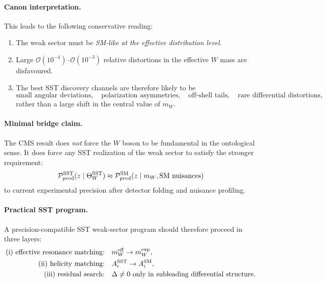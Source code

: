 \documentclass[11pt]{article}
\theoremstyle{definition}
\theoremstyle{plain}
\theoremstyle{remark}
\begin{document}
        \paragraph{Canon interpretation.}
            This leads to the following conservative reading:
            \begin{enumerate}
                \item The weak sector must be \emph{SM-like at the effective distribution level}.
                \item Large $\mathcal{O}(10^{-4})$--$\mathcal{O}(10^{-3})$ relative distortions in the effective $W$ mass are disfavoured.
                \item The best SST discovery channels are therefore likely to be
                \begin{equation}
                    \text{small angular deviations},\quad
                    \text{polarization asymmetries},\quad
                    \text{off-shell tails},\quad
                    \text{rare differential distortions},
                \end{equation}
                rather than a large shift in the central value of $m_W$.
            \end{enumerate}
    
        \paragraph{Minimal bridge claim.}
            The CMS result does \emph{not} force the $W$ boson to be fundamental in the ontological sense. It does force any SST realization of the weak sector to satisfy the stronger requirement:
            \begin{equation}
                \mathcal{P}_{\rm prod}^{\rm SST}(z\mid \Theta_W^{\rm SST})
                \approx
                \mathcal{P}_{\rm prod}^{\rm SM}(z\mid m_W,\text{SM nuisances})
            \end{equation}
            to current experimental precision after detector folding and nuisance profiling.
    
        \paragraph{Practical SST program.}
            A precision-compatible SST weak-sector program should therefore proceed in three layers:
            \begin{align}
                \text{(i) effective resonance matching:}&\quad
                m_W^{\rm eff} \to m_W^{\rm exp}, \\
                \text{(ii) helicity matching:}&\quad
                A_i^{\rm SST} \to A_i^{\rm SM}, \\
                \text{(iii) residual search:}&\quad
                \Delta \neq 0 \text{ only in subleading differential structure.}
            \end{align}
    
\end{document}
